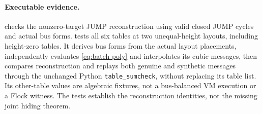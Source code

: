\paragraph{Executable evidence.}  checks the nonzero-target JUMP reconstruction using valid closed JUMP cycles and actual bus forms.  tests all six tables at two unequal-height layouts, including height-zero tables. It derives bus forms from the actual layout placements, independently evaluates \eqref{eq:batch-poly} and interpolates its cubic messages, then compares reconstruction and replays both genuine and synthetic messages through the unchanged Python \texttt{table\_sumcheck}, without replacing its table list. Its other-table values are algebraic fixtures, not a bus-balanced VM execution or a Flock witness. The tests establish the reconstruction identities, not the missing joint hiding theorem.
